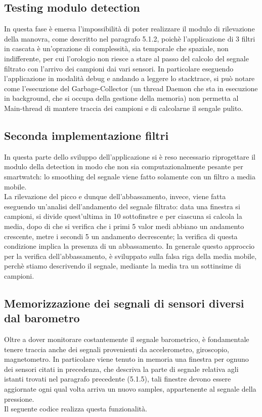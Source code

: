 \documentclass[a4paper, oneside]{book}
\begin{document}
\subsection{Testing modulo detection}
In questa fase è emersa l'impossibilità di poter realizzare il modulo di rilevazione della manovra, come descritto nel paragrafo 5.1.2, poichè l'applicazione di 3 filtri in cascata è un'oprazione di complessità, sia temporale che spaziale, non indifferente, per cui l'orologio non riesce a stare al passo del calcolo del segnale filtrato con l'arrivo dei campioni dai vari sensori. In particolare eseguendo l'applicazione in modalità debug e andando a leggere lo stacktrace, si può notare come l'esecuzione del Garbage-Collector (un thread Daemon che sta in esecuzione in background, che si occupa della gestione della memoria) non permetta al Main-thread di mantere traccia dei campioni e di calcolarne il sengale pulito.

\subsection{Seconda implementazione filtri}
In questa parte dello sviluppo dell'applicazione si è reso necessario riprogettare il modulo della detection in modo che non sia computazionalmente pesante per smartwatch: lo smoothing del segnale viene fatto solamente con un filtro a media mobile. \\
La rilevazione del picco e dunque dell'abbassamento, invece, viene fatta eseguendo un'analisi dell'andamento del segnale filtrato: data una finestra si campioni, si divide quest'ultima in 10 sottofinstre e per ciascuna si calcola la media, dopo di che si verifica che i primi 5 valor medi abbiano un andamento crescente, metre i secondi 5 un andamento decrescente; la verifica di questa condizione implica la presenza di un abbassamento. In generale questo approccio per la verifica dell'abbassamento, è sviluppato sulla falsa riga della media mobile, perchè stiamo descrivendo il segnale, mediante la media tra un sottinsime di campioni.
\vspace{2mm}

\vspace{3mm}

\subsection{Memorizzazione dei segnali di sensori diversi dal barometro}
Oltre a dover monitorare costantemente il segnale barometrico, è fondamentale tenere traccia anche dei segnali provenienti da accelerometro, giroscopio, magnetometro.
In particolare viene tenuto in memoria una finestra per ognuno dei sensori citati in precedenza, che descriva la parte di segnale relativa agli istanti trovati nel paragrafo precedente (5.1.5), tali finestre devono essere aggiornate ogni qual volta arriva un nuovo samples, appartenente al segnale della pressione. \\
Il seguente codice realizza questa funzionalità.
\vspace{6mm}

\vspace{2mm}
\end{document}
